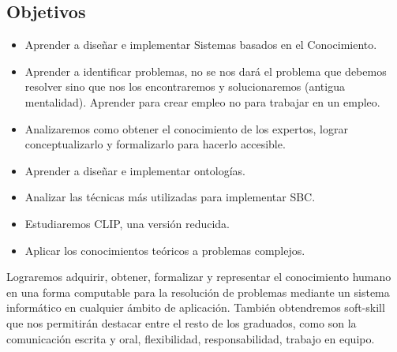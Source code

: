 \documentclass[12pt, twoside, openright]{report} %
\begin{document}
\subsection{Objetivos}
\begin{itemize}
	\item Aprender a diseñar e implementar Sistemas basados en el Conocimiento.
	\item Aprender a identificar problemas, no se nos dará el problema que debemos resolver sino que nos los encontraremos y solucionaremos (antigua mentalidad). Aprender para crear empleo no para trabajar en un empleo.
	\item Analizaremos como obtener el conocimiento de los expertos, lograr conceptualizarlo y formalizarlo para hacerlo accesible.
	\item Aprender a diseñar e implementar ontologías.
	\item Analizar las técnicas más utilizadas para implementar SBC.
	\item Estudiaremos CLIP, una versión reducida.
	\item Aplicar los conocimientos teóricos a problemas complejos.
\end{itemize}
Lograremos adquirir, obtener, formalizar y representar el conocimiento humano en una forma computable para la resolución de problemas mediante un sistema informático en cualquier ámbito de aplicación.
También obtendremos soft-skill que nos permitirán destacar entre el resto de los graduados, como son la comunicación escrita y oral, flexibilidad, responsabilidad, trabajo en equipo.

\pagebreak
\end{document}
